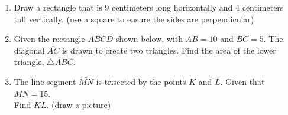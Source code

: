 \documentclass[12pt, twoside]{article}
\begin{document}
\begin{enumerate}
 \newpage
    \item Draw a rectangle that is 9 centimeters long horizontally and 4 centimeters tall vertically. (use a square to ensure the sides are perpendicular)  \vspace{6cm}

    \item Given the rectangle $ABCD$ shown below, with $AB=10$ and $BC=5$. The diagonal $\overline{AC}$ is drawn to create two triangles. Find the area of the lower triangle, $\triangle ABC$.
    \begin{flushleft}
    \end{flushleft}
    \vspace{3cm}

    \item The line segment $\overline{MN}$ is trisected by the points $K$ and $L$. Given that $MN=15$. \\ Find $KL$. (draw a picture)

\end{enumerate}
\end{document}
